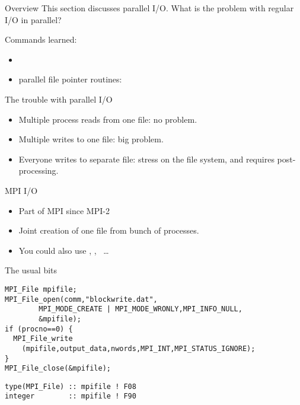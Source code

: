 
\begin{frame}[containsverbatim]{Overview}
  This section discusses parallel I/O. What is the problem with
  regular I/O in parallel?

  Commands learned:
  \begin{itemize}
  \item {}
  \item parallel file pointer routines: 
  \end{itemize}
\end{frame}

\begin{frame}{The trouble with parallel I/O}
  \begin{itemize}
  \item Multiple process reads from one file: no problem.
  \item Multiple writes to one file: big problem.
  \item Everyone writes to separate file: stress on the file system,
    and requires post-processing.
  \end{itemize}
\end{frame}

\begin{frame}{MPI I/O}
  \begin{itemize}
  \item Part of MPI since MPI-2
  \item Joint creation of one file from bunch of processes.
  \item You could also use , , ~\ldots
  \end{itemize}
\end{frame}

\begin{frame}[containsverbatim]{The usual bits}
\small
\lstset{language=C}
\begin{lstlisting}
MPI_File mpifile;
MPI_File_open(comm,"blockwrite.dat",
        MPI_MODE_CREATE | MPI_MODE_WRONLY,MPI_INFO_NULL,
        &mpifile);
if (procno==0) {
  MPI_File_write
    (mpifile,output_data,nwords,MPI_INT,MPI_STATUS_IGNORE);
}
MPI_File_close(&mpifile);
\end{lstlisting}
\lstset{language=Fortran}
\begin{lstlisting}
type(MPI_File) :: mpifile ! F08
integer        :: mpifile ! F90
\end{lstlisting}
\end{frame}

